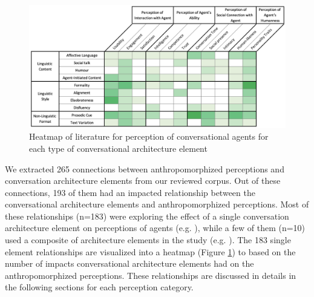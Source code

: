 \documentclass[sigconf,screen,review, anonymous]{acmart}
\newcommand{\cmt}[1]{}%
\begin{document}
\begin{figure}[]
  \centering
  \includegraphics[width=\textwidth]{fig-heatmap-impact.png}
  \caption{Heatmap of literature for perception of conversational agents for each type of conversational architecture element}
  \label{fig:heatmap-impact}
\end{figure}

We extracted 265 connections between anthropomorphized perceptions and conversation architecture elements from our reviewed corpus. Out of these connections, 193 of them had an impacted relationship between the conversational architecture elements and anthropomorphized perceptions. Most of these relationships (n=183) were exploring the effect of a single conversation architecture element on perceptions of agents (e.g. \cite{miehle2018exploring}\cmt{[51]}\cite{westerman2019believe}\cmt{[9]}), while a few of them (n=10) used a composite of architecture elements in the study (e.g. \cite{seeger2021chatbots}\cmt{[35]}\cite{volkel2021manipulating}\cmt{[68]}). The 183 single element relationships are visualized into a heatmap (Figure \ref{fig:heatmap-impact}) to based on the number of impacts conversational architecture elements had on the anthropomorphized perceptions. These relationships are discussed in details in the following sections for each perception category.


 
\end{document}
